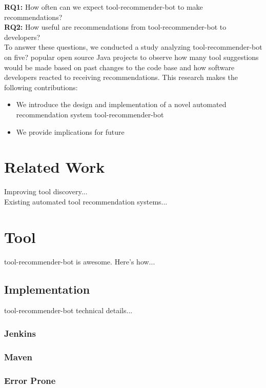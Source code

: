 \documentclass[conference]{IEEEtran}
\newcommand{\tool}{tool-recommender-bot }
\begin{document}
\noindent
\textbf{RQ1:} How often can we expect \tool to make recommendations?  \\
\textbf{RQ2:} How useful are recommendations from \tool to developers?  \\

To answer these questions, we conducted a study analyzing \tool on five? popular open source Java projects to observe how many tool suggestions would be made based on past changes to the code base and how software developers reacted to receiving recommendations. This research makes the following contributions:\\

\begin{itemize}
\item We introduce the design and implementation of a novel automated recommendation system \tool
\item We provide implications for future
\end{itemize}

\section{Related Work}

Improving tool discovery...\\

Existing automated tool recommendation systems...

\section{Tool}
\tool is awesome. Here's how...

\subsection{Implementation}
\tool technical details...

\subsubsection{Jenkins}

\subsubsection{Maven}

\subsubsection{Error Prone}
\end{document}
